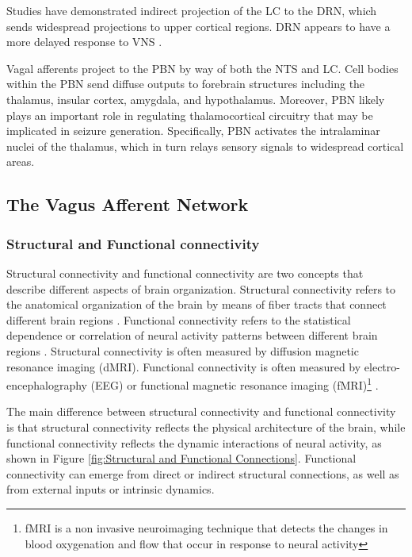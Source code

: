   Studies have demonstrated indirect projection of the LC to the DRN, which sends widespread projections to upper cortical regions. DRN appears to have a more delayed response to VNS \cite{HanchemWongIbrahim2018}.

  Vagal afferents project to the PBN by way of both the NTS and LC. Cell bodies within the PBN send diffuse outputs to forebrain structures including the thalamus, insular cortex, amygdala, and hypothalamus. Moreover, PBN likely plays an important role in regulating thalamocortical circuitry that may be implicated in seizure generation. Specifically, PBN activates the intralaminar nuclei of the thalamus, which in turn relays sensory signals to widespread cortical areas. \cite{HanchemWongIbrahim2018}

  \subsection*{The Vagus Afferent Network}
    \subsubsection*{Structural and Functional connectivity}
    Structural connectivity and functional connectivity are two concepts that describe different aspects of brain organization. Structural connectivity refers to the anatomical organization of the brain by means of fiber tracts that connect different brain regions \cite{sporns2022structure}. Functional connectivity refers to the statistical dependence or correlation of neural activity patterns between different brain regions \cite{GRAFTON2019237}. Structural connectivity is often measured by diffusion magnetic resonance imaging (dMRI). Functional connectivity is often measured by electro-encephalography (EEG) or functional magnetic resonance imaging (fMRI)\footnote{fMRI is a non invasive neuroimaging technique that detects the changes in blood oxygenation and flow that occur in response to neural activity} \cite{sporns2022structure}.

    The main difference between structural connectivity and functional connectivity is that structural connectivity reflects the physical architecture of the brain, while functional connectivity reflects the dynamic interactions of neural activity, as shown in Figure \ref{fig:Structural and Functional Connections}. Functional connectivity can emerge from direct or indirect structural connections, as well as from external inputs or intrinsic dynamics.

